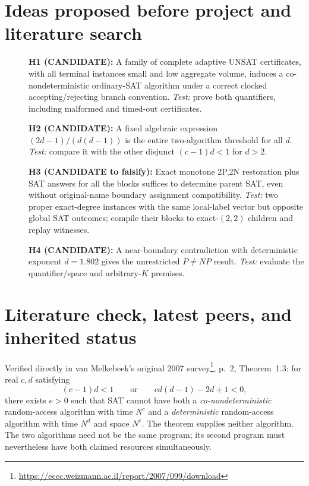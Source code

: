 \documentclass[11pt]{article}
\begin{document}
\section{Ideas proposed before project and literature search}
\begin{description}
\item[] \textbf{H1 (CANDIDATE):} A family of complete adaptive UNSAT
certificates, with all terminal instances small and low aggregate volume,
induces a co-nondeterministic ordinary-SAT algorithm under a correct
clocked accepting/rejecting branch convention. \emph{Test:} prove both
quantifiers, including malformed and timed-out certificates.
\item[] \textbf{H2 (CANDIDATE):} A fixed algebraic expression
$(2d-1)/(d(d-1))$ is the entire two-algorithm threshold for all $d$.
\emph{Test:} compare it with the other disjunct $(c-1)d<1$ for $d>2$.
\item[] \textbf{H3 (CANDIDATE to falsify):} Exact monotone 2P,2N
restoration plus SAT answers for all the blocks suffices to determine
parent SAT, even without original-name boundary assignment compatibility.
\emph{Test:} two proper exact-degree instances with the same local-label
vector but opposite global SAT outcomes; compile their blocks to
exact-$(2,2)$ children and replay witnesses.
\item[] \textbf{H4 (CANDIDATE):} A near-boundary contradiction with
deterministic exponent $d=1.802$ gives the unrestricted $P\ne NP$ result.
\emph{Test:} evaluate the quantifier/space and arbitrary-$K$ premises.
\end{description}

\section{Literature check, latest peers, and inherited status}
Verified directly in van Melkebeek's original 2007 survey\footnote{\url{https://eccc.weizmann.ac.il/report/2007/099/download}}, p.~2,
Theorem~1.3: for real $c,d$ satisfying
\begin{equation}\label{eq:van}
 (c-1)d<1 \qquad\text{or}\qquad cd(d-1)-2d+1<0,
\end{equation}
there exists $e>0$ such that SAT cannot have both a
\emph{co-nondeterministic} random-access algorithm with time $N^c$ and
a \emph{deterministic} random-access algorithm with time $N^d$ and
space $N^e$. The theorem supplies neither algorithm. The two algorithms
need not be the same program; its second program must nevertheless
have both claimed resources simultaneously.
\end{document}
